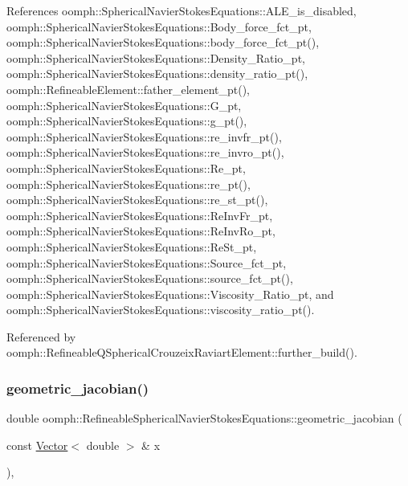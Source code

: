 References oomph\+::\+Spherical\+Navier\+Stokes\+Equations\+::\+A\+L\+E\+\_\+is\+\_\+disabled, oomph\+::\+Spherical\+Navier\+Stokes\+Equations\+::\+Body\+\_\+force\+\_\+fct\+\_\+pt, oomph\+::\+Spherical\+Navier\+Stokes\+Equations\+::body\+\_\+force\+\_\+fct\+\_\+pt(), oomph\+::\+Spherical\+Navier\+Stokes\+Equations\+::\+Density\+\_\+\+Ratio\+\_\+pt, oomph\+::\+Spherical\+Navier\+Stokes\+Equations\+::density\+\_\+ratio\+\_\+pt(), oomph\+::\+Refineable\+Element\+::father\+\_\+element\+\_\+pt(), oomph\+::\+Spherical\+Navier\+Stokes\+Equations\+::\+G\+\_\+pt, oomph\+::\+Spherical\+Navier\+Stokes\+Equations\+::g\+\_\+pt(), oomph\+::\+Spherical\+Navier\+Stokes\+Equations\+::re\+\_\+invfr\+\_\+pt(), oomph\+::\+Spherical\+Navier\+Stokes\+Equations\+::re\+\_\+invro\+\_\+pt(), oomph\+::\+Spherical\+Navier\+Stokes\+Equations\+::\+Re\+\_\+pt, oomph\+::\+Spherical\+Navier\+Stokes\+Equations\+::re\+\_\+pt(), oomph\+::\+Spherical\+Navier\+Stokes\+Equations\+::re\+\_\+st\+\_\+pt(), oomph\+::\+Spherical\+Navier\+Stokes\+Equations\+::\+Re\+Inv\+Fr\+\_\+pt, oomph\+::\+Spherical\+Navier\+Stokes\+Equations\+::\+Re\+Inv\+Ro\+\_\+pt, oomph\+::\+Spherical\+Navier\+Stokes\+Equations\+::\+Re\+St\+\_\+pt, oomph\+::\+Spherical\+Navier\+Stokes\+Equations\+::\+Source\+\_\+fct\+\_\+pt, oomph\+::\+Spherical\+Navier\+Stokes\+Equations\+::source\+\_\+fct\+\_\+pt(), oomph\+::\+Spherical\+Navier\+Stokes\+Equations\+::\+Viscosity\+\_\+\+Ratio\+\_\+pt, and oomph\+::\+Spherical\+Navier\+Stokes\+Equations\+::viscosity\+\_\+ratio\+\_\+pt().



Referenced by oomph\+::\+Refineable\+Q\+Spherical\+Crouzeix\+Raviart\+Element\+::further\+\_\+build().

\mbox{\label{classoomph_1_1RefineableSphericalNavierStokesEquations_a2705f68643cc0fc85bc31f8b26189b6d}} 
\subsubsection{\texorpdfstring{geometric\+\_\+jacobian()}{geometric\_jacobian()}}
{\footnotesize\ttfamily double oomph\+::\+Refineable\+Spherical\+Navier\+Stokes\+Equations\+::geometric\+\_\+jacobian (\begin{DoxyParamCaption}\item[{const \hyperlink{classoomph_1_1Vector}{Vector}$<$ double $>$ \&}]{x }\end{DoxyParamCaption})\hspace{0.3cm}{\ttfamily [inline]}, {\ttfamily [virtual]}}




